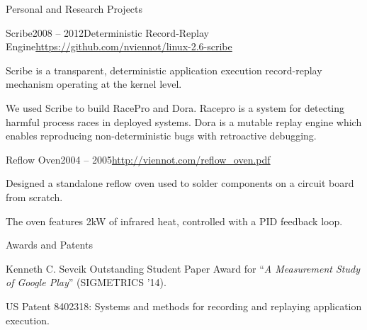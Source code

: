 \documentclass{resume} %
\begin{document}
\begin{rSection}{Personal and Research Projects}
\begin{rSubsection}{Scribe}{2008 -- 2012}{Deterministic Record-Replay Engine}{\url{https://github.com/nviennot/linux-2.6-scribe}}
\item Scribe is a transparent, deterministic application execution record-replay mechanism operating at the kernel level.
\item We used Scribe to build RacePro and Dora. Racepro is a system for detecting harmful process races in deployed systems.
Dora is a mutable replay engine which enables reproducing non-deterministic bugs with retroactive debugging.
\end{rSubsection}

\begin{rSubsection}{Reflow Oven}{2004 -- 2005}{\url{http://viennot.com/reflow\_oven.pdf}}{}
\item Designed a standalone reflow oven used to solder components on a circuit board from scratch.
\item The oven features 2kW of infrared heat, controlled with a PID feedback loop.
\end{rSubsection}

\end{rSection}


\begin{rSection}{Awards and Patents}
\begin{rList}
\item Kenneth C. Sevcik Outstanding Student Paper Award for ``{\em A Measurement Study of Google Play}'' (SIGMETRICS '14).
\item US Patent 8402318: Systems and methods for recording and replaying application execution.
\end{rList}
\end{rSection}

\end{document}
